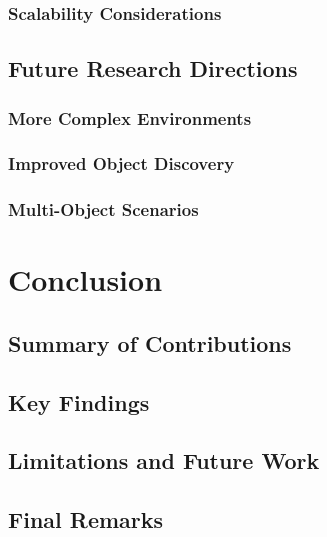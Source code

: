 \documentclass[
	english,
	ruledheaders=section,
	class=report,
	thesis={type=master},
	accentcolor=9c,
	custommargins=true,
	marginpar=false,
	parskip=half-,
	fontsize=11pt,
]{tudapub}
\begin{document}
\subsection{Scalability Considerations}
\label{subsec:scalability}

\section{Future Research Directions}
\label{sec:future_work}

\subsection{More Complex Environments}
\label{subsec:complex_environments}

\subsection{Improved Object Discovery}
\label{subsec:object_discovery}

\subsection{Multi-Object Scenarios}
\label{subsec:multi_object}

\chapter{Conclusion}
\label{chap:conclusion}

\section{Summary of Contributions}
\label{sec:summary_contributions}

\section{Key Findings}
\label{sec:key_findings}

\section{Limitations and Future Work}
\label{sec:limitations_future}

\section{Final Remarks}
\label{sec:final_remarks}
\end{document}
